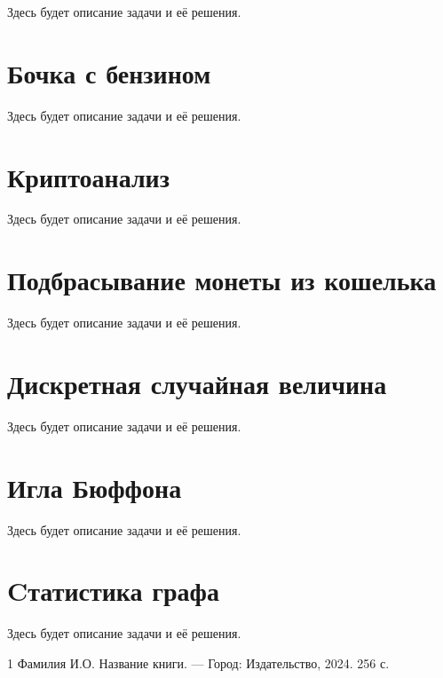 \documentclass[14pt,a4paper]{extarticle}
\begin{document}
Здесь будет описание задачи и её решения.


\section{Бочка с бензином}

Здесь будет описание задачи и её решения.


\section{Криптоанализ}

Здесь будет описание задачи и её решения.


\section{Подбрасывание монеты из кошелька}

Здесь будет описание задачи и её решения.


\section{Дискретная случайная величина}

Здесь будет описание задачи и её решения.


\section{Игла Бюффона}

Здесь будет описание задачи и её решения.


\section{Cтатистика графа}

Здесь будет описание задачи и её решения.



\begin{thebibliography}{1}
  Фамилия И.О. Название книги. --- Город: Издательство, 2024. 256 с.
\end{thebibliography}
\end{document}
